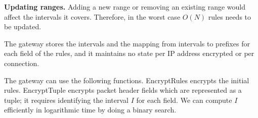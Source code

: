 \noindent \textbf{Updating ranges.}
Adding a new range or removing an existing range would affect the intervals it covers. Therefore, in the worst case $O(N)$ rules needs to be updated. 




The gateway stores the intervals and the mapping from intervals to prefixes for each field of the rules, and it maintains no state per IP address encrypted or per connection.

The gateway can use the following functions. EncryptRules encrypts the initial rules. EncryptTuple encrypts packet header fields which are represented as a tuple; it requires identifying the interval $I$ for each field. We can compute $I$ efficiently in logarithmic time by doing a binary search. 






%
%
%

